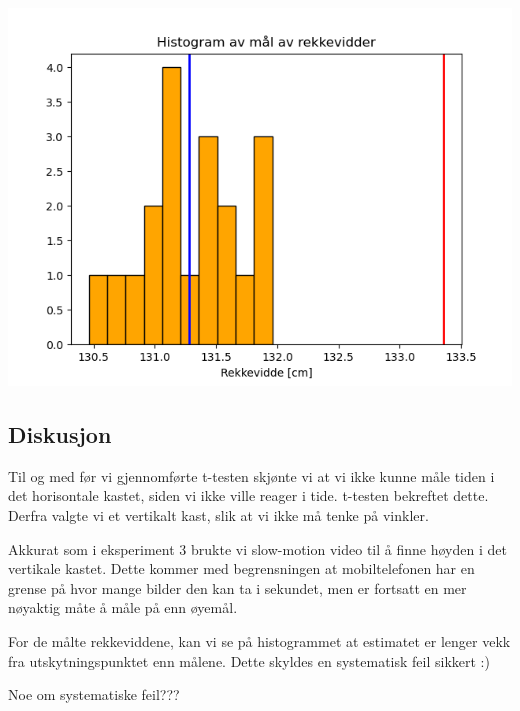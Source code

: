 \bigskip \hfil
\includegraphics[scale = 0.75]{Figurer/HistRekkevidde.png} 
\label{RekkeviddeDiagram}
\par \bigskip


\subsection{Diskusjon}

Til og med før vi gjennomførte t-testen skjønte vi at vi ikke kunne måle tiden i det horisontale kastet, siden vi ikke ville reager i tide. t-testen bekreftet dette. Derfra valgte vi et vertikalt kast, slik at vi ikke må tenke på vinkler. 

Akkurat som i eksperiment 3 brukte vi slow-motion video til å finne høyden i det vertikale kastet. Dette kommer med begrensningen at mobiltelefonen har en grense på hvor mange bilder den kan ta i sekundet, men er fortsatt en mer nøyaktig måte å måle på enn øyemål.\medskip

For de målte rekkeviddene, kan vi se på histogrammet at estimatet er lenger vekk fra utskytningspunktet enn målene. Dette skyldes en systematisk feil sikkert :)

Noe om systematiske feil???